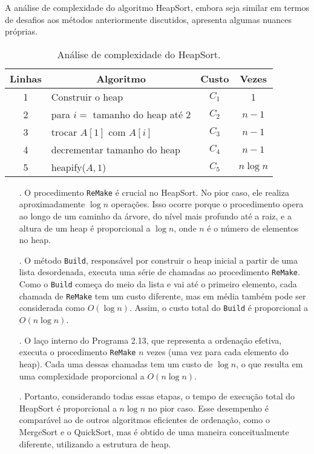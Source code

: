 A análise de complexidade do algoritmo HeapSort, embora seja similar em termos de desafios aos métodos anteriormente discutidos, apresenta algumas nuances próprias.

\begin{table}[h]
\centering
\begin{tabular}{|c|l|c|c|}
\hline
\textbf{Linhas} & \multicolumn{1}{c|}{\textbf{Algoritmo}} & \textbf{Custo} & \textbf{Vezes} \\ \hline
1               & Construir o heap                         & \(C_1\)        & 1               \\ \hline
2               & para \(i =\) tamanho do heap até \(2\)   & \(C_2\)        & \(n-1\)         \\ \hline
3               & trocar \(A[1]\) com \(A[i]\)             & \(C_3\)        & \(n-1\)         \\ \hline
4               & decrementar tamanho do heap              & \(C_4\)        & \(n-1\)         \\ \hline
5               & heapify(\(A, 1\))                        & \(C_5\)        & \(n \log n\)    \\ \hline
\end{tabular}
\caption{Análise de complexidade do HeapSort.}
\label{tab:heapsort-complexity}
\end{table}

\begin{itemize}
  \item[.] O procedimento \texttt{ReMake} é crucial no HeapSort. No pior caso, ele realiza aproximadamente $\log n$ operações. Isso ocorre porque o procedimento opera ao longo de um caminho da árvore, do nível mais profundo até a raiz, e a altura de um heap é proporcional a $\log n$, onde $n$ é o número de elementos no heap.
  \item[.] O método \texttt{Build}, responsável por construir o heap inicial a partir de uma lista desordenada, executa uma série de chamadas ao procedimento \texttt{ReMake}. Como o \texttt{Build} começa do meio da lista e vai até o primeiro elemento, cada chamada de \texttt{ReMake} tem um custo diferente, mas em média também pode ser considerada como $O(\log n)$. Assim, o custo total do \texttt{Build} é proporcional a $O(n \log n)$.
  \item[.] O laço interno do Programa 2.13, que representa a ordenação efetiva, executa o procedimento \texttt{ReMake} $n$ vezes (uma vez para cada elemento do heap). Cada uma dessas chamadas tem um custo de $\log n$, o que resulta em uma complexidade proporcional a $O(n \log n)$.
  \item[.] Portanto, considerando todas essas etapas, o tempo de execução total do HeapSort é proporcional a $n \log n$ no pior caso. Esse desempenho é comparável ao de outros algoritmos eficientes de ordenação, como o MergeSort e o QuickSort, mas é obtido de uma maneira conceitualmente diferente, utilizando a estrutura de heap.
\end{itemize}
